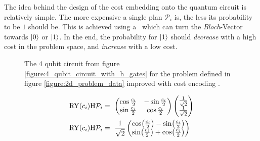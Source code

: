 The idea behind the design of the cost embedding onto the quantum circuit is relatively simple. The more expensive a single plan $\mathcal{P}_i$ is, the less its probability to be $1$ should be. This is achieved using a \rygate\, which can turn the \emph{Bloch}-Vector towards $\ket{0}$ or $\ket{1}$. In the end, the probability for $\ket{1}$ should \emph{decrease} with a high cost in the problem space, and \emph{increase} with a low cost.

\begin{figure}[!h]
    \centering
    \caption{The 4 qubit circuit from figure \ref{figure:4_qubit_circuit_with_h_gates} for the problem defined in figure \ref{figure:2d_problem_data} improved with cost encoding \rygate.}
    \label{figure:4_qubit_circuit_with_h_ry_gates}
\end{figure}

\begin{equation}
    \centering
    \begin{split}
        \mathrm{RY}(c_i)\mathrm{H}\mathcal{P}_i &=\ \begin{pmatrix} \cos{\frac{c_i}{2}} & -\sin{\frac{c_i}{2}} \\ \sin{\frac{c_i}{2}} & \cos{\frac{c_i}{2}} \end{pmatrix}\begin{pmatrix}\frac{1}{\sqrt{2}} \\ \frac{1}{\sqrt{2}}\end{pmatrix}\\
        \mathrm{RY}(c_i)\mathrm{H}\mathcal{P}_i &=\ \frac{1}{\sqrt{2}}\begin{pmatrix}\cos(\frac{c_i}{2}) - \sin(\frac{c_i}{2}) \\ \sin(\frac{c_i}{2}) + \cos(\frac{c_i}{2})\end{pmatrix}\\
    \end{split}
    \label{equation:2d_problem_state_0_1}
\end{equation}



